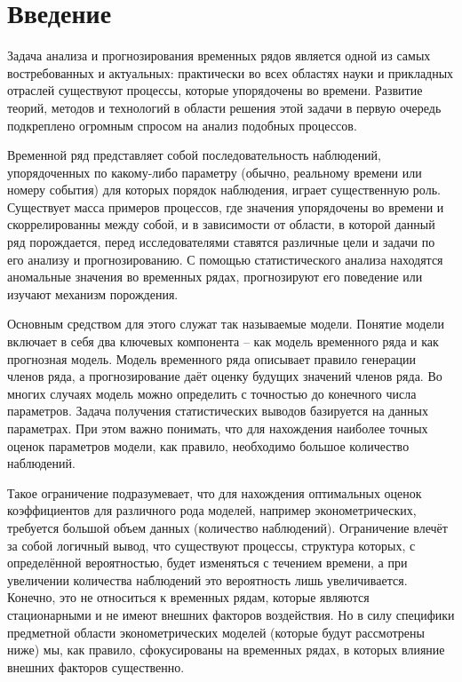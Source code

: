 \documentclass[a4paper,14pt,russian]{extarticle}
\begin{document}
	\section*{Введение}
	Задача анализа и прогнозирования временных рядов является одной из самых востребованных и актуальных: практически во всех областях науки и прикладных отраслей существуют процессы, которые упорядочены во времени. Развитие теорий, методов и технологий в области решения этой задачи в первую очередь подкреплено огромным спросом на анализ подобных процессов.
	\par
	Временной ряд представляет собой последовательность наблюдений, упорядоченных по какому-либо параметру (обычно, реальному времени или номеру события) для которых порядок наблюдения, играет существенную роль. Существует масса примеров процессов, где значения упорядочены во времени и скоррелированны между собой, и в зависимости от области, в которой данный ряд порождается, перед исследователями ставятся различные цели и задачи по его анализу и прогнозированию. С помощью статистического анализа находятся аномальные значения во временных рядах, прогнозируют его поведение или изучают механизм порождения.
	\par
	Основным средством для этого служат так называемые модели. Понятие модели включает в себя два ключевых компонента – как модель временного ряда и как прогнозная модель. Модель временного ряда описывает правило генерации членов ряда, а прогнозирование даёт оценку будущих значений членов ряда. Во многих случаях модель можно определить с точностью до конечного числа параметров. Задача получения статистических выводов базируется на данных параметрах. При этом важно понимать, что для нахождения наиболее точных оценок параметров модели, как правило, необходимо большое количество наблюдений.
	\par
	Такое ограничение подразумевает, что для нахождения оптимальных оценок коэффициентов для различного рода моделей, например эконометрических, требуется большой объем данных (количество наблюдений). Ограничение влечёт за собой логичный вывод, что существуют процессы, структура которых, с определённой вероятностью, будет изменяться с течением времени, а при увеличении количества наблюдений это вероятность лишь увеличивается. Конечно, это не относиться к временных рядам, которые являются стационарными и не имеют внешних факторов воздействия. Но в силу специфики предметной области эконометрических моделей (которые будут рассмотрены ниже) мы, как правило, сфокусированы на временных рядах, в которых влияние внешних факторов существенно.
\end{document}
